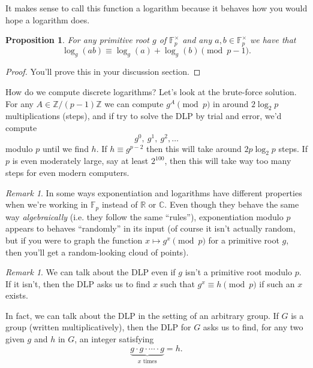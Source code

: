 \documentclass[12pt]{article}
\theoremstyle{plain}
\newtheorem{proposition}[theorem]{Proposition}
\theoremstyle{definition}
\theoremstyle{remark}
\newtheorem{remark}[theorem]{Remark}
\newcommand{\Z}{\mathbb{Z}}
\newcommand{\C}{\mathbb{C}}
\newcommand{\R}{\mathbb{R}}
\newcommand{\F}{\mathbb{F}}
\begin{document}
It makes sense to call this function a logarithm because it behaves how you would hope a logarithm does.
\begin{proposition}
    For any primitive root $g$ of $\F_p^\times$ and any $a,b\in \F_p^\times$ we have that
    \[
        \log_g(ab) \equiv \log_g(a) + \log_g(b)\pmod{p-1}.
    \]
\end{proposition}
\begin{proof}
    You'll prove this in your discussion section.
\end{proof}

How do we compute discrete logarithms?
Let's look at the brute-force solution.
For any $A\in \Z/(p-1)\Z$ we can compute $g^A\pmod p$ in around $2\log_2p$ multiplications (steps), and if try to solve the DLP by trial and error, we'd compute
\[
    g^0,\ g^1,\ g^2, \ldots
\]
modulo $p$ until we find $h$.
If $h \equiv g^{p-2}$ then this will take around $2p\log_2p$ steps.
If $p$ is even moderately large, say at least $2^{100}$, then this will take way too many steps for even modern computers.

\begin{remark}
    In some ways exponentiation and logarithms have different properties when we're working in $\F_p$ instead of $\R$ or $\C$.
    Even though they behave the same way \emph{algebraically} (i.e. they follow the same ``rules''), exponentiation modulo $p$ appears to behaves ``randomly'' in its input (of course it isn't actually random, but if you were to graph the function $x\mapsto g^x \pmod p$ for a primitive root $g$, then you'll get a random-looking cloud of points).
\end{remark}

\begin{remark}
    We can talk about the DLP even if $g$ isn't a primitive root modulo $p$.
    If it isn't, then the DLP asks us to find $x$ such that $g^x\equiv h\pmod p$ if such an $x$ exists.

    In fact, we can talk about the DLP in the setting of an arbitrary group.
    If $G$ is a group (written multiplicatively), then the DLP for $G$ asks us to find, for any two given $g$ and $h$ in $G$, an integer satisfying
    \[
        \underbrace{g\cdot g \cdot \cdots \cdot g}_{x\text{ times}} = h.
    \]
\end{remark}
\end{document}
